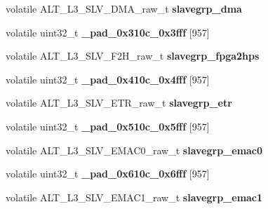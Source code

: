 \begin{DoxyCompactItemize}
volatile A\+L\+T\+\_\+\+L3\+\_\+\+S\+L\+V\+\_\+\+D\+M\+A\+\_\+raw\+\_\+t {\bfseries slavegrp\+\_\+dma}
\item 
\mbox{\label{structALT__L3__SLVGRP__raw__s_a88ae0074e90f2ff8de9237ac5f57d068}} 
volatile uint32\+\_\+t {\bfseries \+\_\+pad\+\_\+0x310c\+\_\+0x3fff} \mbox{[}957\mbox{]}
\item 
\mbox{\label{structALT__L3__SLVGRP__raw__s_ad34acaac6ddebbe5cc6d6a33d03f8e1e}} 
volatile A\+L\+T\+\_\+\+L3\+\_\+\+S\+L\+V\+\_\+\+F2\+H\+\_\+raw\+\_\+t {\bfseries slavegrp\+\_\+fpga2hps}
\item 
\mbox{\label{structALT__L3__SLVGRP__raw__s_a913a028f7d2a8c65b25c4e6576ece580}} 
volatile uint32\+\_\+t {\bfseries \+\_\+pad\+\_\+0x410c\+\_\+0x4fff} \mbox{[}957\mbox{]}
\item 
\mbox{\label{structALT__L3__SLVGRP__raw__s_a7f791ef58a57cd0d5fca383c81ed46bd}} 
volatile A\+L\+T\+\_\+\+L3\+\_\+\+S\+L\+V\+\_\+\+E\+T\+R\+\_\+raw\+\_\+t {\bfseries slavegrp\+\_\+etr}
\item 
\mbox{\label{structALT__L3__SLVGRP__raw__s_a6bb5b24aaa9da5af8753d02c51516d2b}} 
volatile uint32\+\_\+t {\bfseries \+\_\+pad\+\_\+0x510c\+\_\+0x5fff} \mbox{[}957\mbox{]}
\item 
\mbox{\label{structALT__L3__SLVGRP__raw__s_a2e70690ac5fd27cb1fe2f8f4b2367120}} 
volatile A\+L\+T\+\_\+\+L3\+\_\+\+S\+L\+V\+\_\+\+E\+M\+A\+C0\+\_\+raw\+\_\+t {\bfseries slavegrp\+\_\+emac0}
\item 
\mbox{\label{structALT__L3__SLVGRP__raw__s_abd93ded208783cc510a599234e65d96f}} 
volatile uint32\+\_\+t {\bfseries \+\_\+pad\+\_\+0x610c\+\_\+0x6fff} \mbox{[}957\mbox{]}
\item 
\mbox{\label{structALT__L3__SLVGRP__raw__s_a8088d36a7119cb03060b4aa144df8fba}} 
volatile A\+L\+T\+\_\+\+L3\+\_\+\+S\+L\+V\+\_\+\+E\+M\+A\+C1\+\_\+raw\+\_\+t {\bfseries slavegrp\+\_\+emac1}
\item 
\mbox{\label{structALT__L3__SLVGRP__raw__s_aa61bc95bd8a66827d00b628175f7708f}} 

\end{DoxyCompactItemize}

